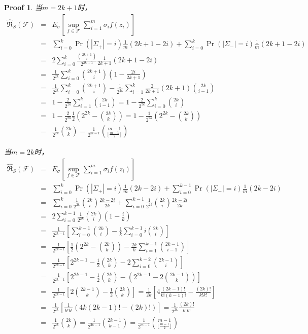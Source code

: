 \documentclass[a4paper,UTF8]{article}
\numberwithin{equation}{section}
\newtheorem*{myProof}{Proof}
\begin{document}
\begin{myProof}
当$m=2k + 1$时，
\begin{eqnarray*}
\hat{\mathfrak{R}}_S(\mathcal{F}) &=& E_{\sigma}[\sup_{f \in \mathcal{F}} \sum_{i = 1}^m \sigma_i f(z_i)] \\
&=& \sum_{i=0}^{k} \Pr (|\Sigma_+|=i)\frac{1}{m}(2k + 1 - 2i) + \sum_{i=0}^{k} \Pr (|\Sigma_-|=i)\frac{1}{m}(2k + 1 - 2i) \\
&=& 2 \sum_{i=0}^{k} \frac{\binom{2k+1}{i}}{2^{2k+1}} \frac{1}{2k+1}(2k+1-2i) \\
&=& \frac{1}{2^{2k}} \sum_{i=0}^{k} \binom{2k+1}{i} (1 - \frac{2i}{2k+1}) \\
&=& \frac{1}{2^{2k}} \sum_{i=0}^{k} \binom{2k+1}{i} - \frac{1}{2^{2k}} \sum_{i=1}^{k} \frac{2}{2k+1} (2k+1) \binom{2k}{i-1} \\
&=& 1 - \frac{2}{2^{2k}} \sum_{i=1}^k \binom{2k}{i-1} = 1 - \frac{2}{2^{2k}} \sum_{i=0}^k \binom{2k}{i} \\
&=& 1- \frac{2}{2^{2k}} \frac{1}{2} (2^{2k} - \binom{2k}{k}) = 1 - \frac{1}{2^{2k}} (2^{2k} - \binom{2k}{k}) \\
&=& \frac{1}{2^{2k}} \binom{2k}{k} = \frac{1}{2^{m-1}}\binom{m-1}{\lfloor \frac{m-1}{2} \rfloor}
\end{eqnarray*}

当$m=2k$时，
\begin{eqnarray*}
\hat{\mathfrak{R}}_S(\mathcal{F}) &=& E_{\sigma}[\sup_{f \in \mathcal{F}} \sum_{i = 1}^m \sigma_i f(z_i)] \\
&=& \sum_{i=0}^{k} \Pr(|\Sigma_+|=i) \frac{1}{m}(2k-2i) + \sum_{i=0}^{k-1} \Pr(|\Sigma_-|=i) \frac{1}{m}(2k-2i) \\
&=& \sum_{i=0}^k \frac{1}{2^{2k}} \binom{2k}{i} \frac{2k-2i}{2k} + \sum_{i=0}^{k-1} \frac{1}{2^{2k}} \binom{2k}{i} \frac{2k-2i}{2k} \\
&=& 2 \sum_{i=0}^{k-1} \frac{1}{2^{2k}} \binom{2k}{i} (1 - \frac{i}{k}) \\
&=& \frac{1}{2^{2k-1}} \left[ \sum_{i=0}^{k-1} \binom{2k}{i} - \frac{1}{k} \sum_{i=0}^{k-1} i \binom{2k}{i} \right] \\
&=& \frac{1}{2^{2k-1}} \left[ \frac{1}{2}(2^{2k} - \binom{2k}{k} )- \frac{2k}{k} \sum_{i=1}^{k-1} \binom{2k-1}{i-1} \right] \\
&=& \frac{1}{2^{2k-1}} \left[ 2^{2k-1} - \frac{1}{2} \binom{2k}{k} - 2\sum_{i=0}^{k-2} \binom{2k-1}{i} \right] \\
&=& \frac{1}{2^{2k-1}} \left[ 2^{2k-1} - \frac{1}{2} \binom{2k}{k} - (2^{2k-1} - 2 \binom{2k-1}{k}) \right] \\
&=& \frac{1}{2^{2k-1}} \left[ 2 \binom{2k-1}{k} - \frac{1}{2} \binom{2k}{k} \right] = \frac{1}{2k} \left[ 4 \frac{(2k-1)!}{k!(k-1)!} - \frac{(2k)!}{k!k!} \right] \\
&=& \frac{1}{2^{2k}} \left[ \frac{1}{k!k!} (4k(2k-1)! - (2k)!) \right] = \frac{1}{2^{2k}} \frac{(2k)!}{k!k!} \\
&=& \frac{1}{2^{2k}}\binom{2k}{k} = \frac{1}{2^{2k-1}}\binom{2k-1}{k-1} = \frac{1}{2^{m-1}}\binom{m-1}{\lfloor \frac{m-1}{2} \rfloor} \\
\end{eqnarray*}


\end{myProof}
\end{document}
